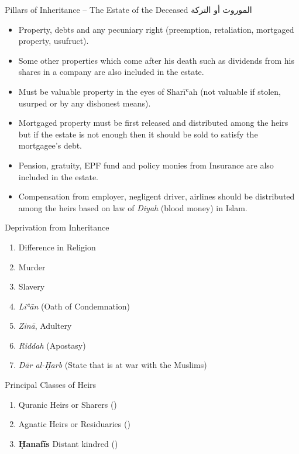 \begin{frame}{Pillars of Inheritance -- The Estate of the Deceased \hfill {الموروث أو التركة}}
\begin{itemize}
\item Property, debts and any pecuniary right (preemption, retaliation, mortgaged property, usufruct).
\item Some other properties which come after his death such as dividends from his shares in a company are also included in the estate.
\item Must be valuable property in the eyes of Sharīʿah (not valuable if stolen, usurped or by any dishonest means).
\item Mortgaged property must be first released and distributed among the heirs but if the estate is not enough then it should be sold to satisfy the mortgagee’s debt.
\item Pension, gratuity, EPF fund and policy monies from Insurance are also included in the estate.
\item Compensation from employer, negligent driver, airlines should be distributed among the heirs based on law of \textit{Diyah} (blood money) in Islam.
\end{itemize}
\end{frame}

\begin{frame}{Deprivation from Inheritance}
\begin{enumerate}
\item Difference in Religion
\item Murder
\item Slavery
\item \textit{Liʿān} (Oath of Condemnation)
\item \textit{Zinā}, Adultery
\item \textit{Riddah} (Apostasy)
\item \textit{Dār al-Ḥarb} (State that is at war with the Muslims)
\end{enumerate}
\end{frame}

\begin{frame}{Principal Classes of Heirs}
\begin{enumerate}
\item Quranic Heirs or Sharers (\arabicsans{})
\item Agnatic Heirs or Residuaries (\arabicsans{})
\item \textbf{Ḥanafīs} Distant kindred (\arabicsans{})
\end{enumerate}
\end{frame}

